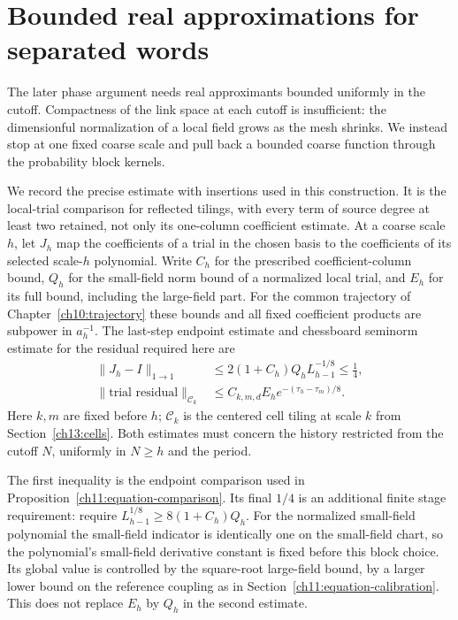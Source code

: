 \section{Bounded real approximations for separated words}
\label{ch13:bounded-approximations}

The later phase argument needs real approximants bounded uniformly in
the cutoff. Compactness of the link space at each cutoff is insufficient:
the dimensionful normalization of a local field grows as the mesh shrinks.
We instead stop at one fixed coarse scale and pull back a bounded coarse
function through the probability block kernels.

We record the precise estimate with insertions used in this construction. It is
the local-trial comparison for reflected tilings, with every term of source degree at least two
retained, not only its one-column coefficient estimate. At a coarse
scale $h$, let $J_h$ map the coefficients of a trial in the chosen basis
to the coefficients of its selected scale-$h$ polynomial. Write $C_h$
for the prescribed coefficient-column bound,
$Q_h$ for the small-field norm bound of a normalized local trial, and
$E_h$ for its full bound, including the large-field
part. For the common trajectory of Chapter~\ref{ch10:trajectory} these bounds and all fixed coefficient
products are subpower in $a_h^{-1}$. The last-step endpoint estimate
and chessboard seminorm estimate for the residual required here are
\begin{align}
 \|J_h-I\|_{1\to1}&\le
           2(1+C_h)Q_hL_{h-1}^{-1/8}\le\tfrac14,
 \label{ch13:coarse-matrix}\\
 \|\text{trial residual}\|_{\mathcal C_k}
       &\le C_{k,m,d}E_h e^{-(\tau_h-\tau_m)/8}.
 \label{ch13:coarse-residual}
\end{align}
Here $k,m$ are fixed before $h$; $\mathcal C_k$ is the centered
cell tiling at scale $k$ from Section~\ref{ch13:cells}. Both estimates must concern the history restricted from
the cutoff $N$, uniformly in $N\ge h$ and the period.

The first inequality is the endpoint comparison used in
Proposition~\ref{ch11:equation-comparison}. Its final $1/4$ is an
additional finite stage requirement: require $L_{h-1}^{1/8}\ge8(1+C_h)Q_h$. For the normalized small-field polynomial the small-field indicator
is identically one on the small-field chart, so the polynomial's small-field derivative
constant is fixed before this block choice. Its global value is controlled by
the square-root large-field bound, by a larger lower bound on the reference coupling as in
Section~\ref{ch11:equation-calibration}. This does not replace $E_h$ by
$Q_h$ in the second estimate.

